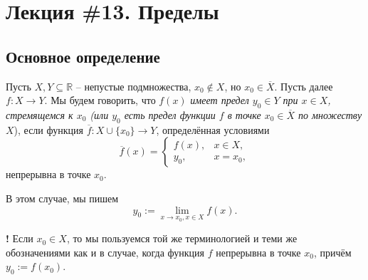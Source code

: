 \section{Лекция \#13. Пределы}

\subsection{Основное определение}

\begin{definition}\label{the_main_def_of_limit_on_R}
Пусть $X, Y \subseteq \mathbb{R}$ -- непустые подмножества, $x_0 \notin X$, но $x_0 \in \overline{X}$. Пусть далее $f: X \to Y$. Мы будем говорить, что $f(x)$ \textit{имеет предел $y_0 \in Y$ при $x \in X$, стремящемся к $x_0$ (или $y_0$ есть предел функции $f$ в точке $x_0 \in \overline{X}$ по множеству $X$}), если функция $\overline{f}:X \cup \{x_0\} \to Y$, определённая условиями
    \[
     \overline{f}(x) = \begin{cases}
         f(x), & x \in X, \\
         y_0, & x = x_0,
     \end{cases}
    \]
    непрерывна в точке $x_0$.
\end{definition}

В этом случае, мы пишем
\[
 y_0 := \lim_{x\to x_0, x \in X} f(x).
\]

\begin{mydanger}{\bf{!}}
    Если $x_0 \in X$, то мы пользуемся той же терминологией и теми же обозначениями как и в случае, когда функция $f$ непрерывна в точке $x_0$, причём $y_0:=f(x_0).$
\end{mydanger}

